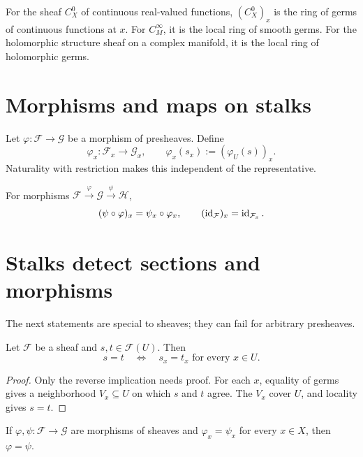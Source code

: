 For the sheaf $C^0_X$ of continuous real-valued functions, $(C^0_X)_x$ is the ring of germs
of continuous functions at $x$.  For $C^\infty_M$, it is the local ring of smooth germs.
For the holomorphic structure sheaf on a complex manifold, it is the local ring of
holomorphic germs.

\section{Morphisms and maps on stalks}

Let $\varphi:\mathcal F\to\mathcal G$ be a morphism of presheaves.  Define
\[
\varphi_x:\mathcal F_x\longrightarrow\mathcal G_x,
\qquad
\varphi_x(s_x):=(\varphi_U(s))_x.
\]
Naturality with restriction makes this independent of the representative.



\begin{proposition}
For morphisms $\mathcal F\xrightarrow{\varphi}\mathcal G\xrightarrow{\psi}\mathcal H$,
\[
(\psi\circ\varphi)_x=\psi_x\circ\varphi_x,
\qquad
(\operatorname{id}_{\mathcal F})_x=\operatorname{id}_{\mathcal F_x}.
\]
\end{proposition}

\section{Stalks detect sections and morphisms}

The next statements are special to sheaves; they can fail for arbitrary presheaves.

\begin{theorem}
Let $\mathcal F$ be a sheaf and $s,t\in\mathcal F(U)$.  Then
\[
s=t\quad\Longleftrightarrow\quad s_x=t_x\text{ for every }x\in U.
\]
\end{theorem}
\begin{proof}
Only the reverse implication needs proof.  For each $x$, equality of germs gives a
neighborhood $V_x\subseteq U$ on which $s$ and $t$ agree.  The $V_x$ cover $U$, and
locality gives $s=t$.
\end{proof}

\begin{corollary}
If $\varphi,\psi:\mathcal F\to\mathcal G$ are morphisms of sheaves and
$\varphi_x=\psi_x$ for every $x\in X$, then $\varphi=\psi$.
\end{corollary}

